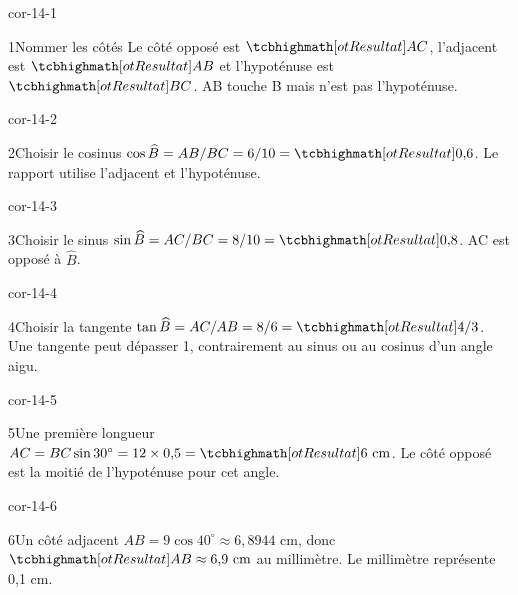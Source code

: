\clearpage\pagestyle{otMain}\fontsize{11}{15}\selectfont{}
\begin{blocLivre}{cor-14-1}\begin{corrige}{1}{Nommer les côtés}
Le côté opposé est $\res{AC}$, l’adjacent est $\res{AB}$ et l’hypoténuse est $\res{BC}$. AB touche B mais n’est pas l’hypoténuse.
\label{fig-cor-14-1}
\end{corrige}\end{blocLivre}
\begin{blocLivre}{cor-14-2}\begin{corrige}{2}{Choisir le cosinus}
$\cos\widehat B=AB/BC=6/10=\res{0{,}6}$. Le rapport utilise l’adjacent et l’hypoténuse.
\label{fig-cor-14-2}
\end{corrige}\end{blocLivre}
\begin{blocLivre}{cor-14-3}\begin{corrige}{3}{Choisir le sinus}
$\sin\widehat B=AC/BC=8/10=\res{0{,}8}$. AC est opposé à $\widehat B$.
\label{fig-cor-14-3}
\end{corrige}\end{blocLivre}
\begin{blocLivre}{cor-14-4}\begin{corrige}{4}{Choisir la tangente}
$\tan\widehat B=AC/AB=8/6=\res{4/3}$. Une tangente peut dépasser 1, contrairement au sinus ou au cosinus d’un angle aigu.
\label{fig-cor-14-4}
\end{corrige}\end{blocLivre}
\begin{blocLivre}{cor-14-5}\begin{corrige}{5}{Une première longueur}
$AC=BC\sin30^\circ=12\times0{,}5=\res{6\text{ cm}}$. Le côté opposé est la moitié de l’hypoténuse pour cet angle.
\label{fig-cor-14-5}
\end{corrige}\end{blocLivre}
\begin{blocLivre}{cor-14-6}\begin{corrige}{6}{Un côté adjacent}
$AB=9\cos40^\circ\approx6{,}8944$ cm, donc $\res{AB\approx6{,}9\text{ cm}}$ au millimètre. Le millimètre représente 0,1 cm.
\label{fig-cor-14-6}
\end{corrige}\end{blocLivre}
